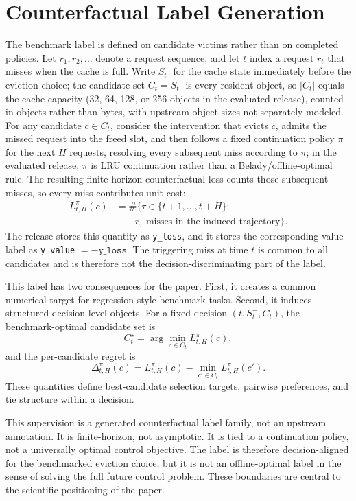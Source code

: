 \section{Counterfactual Label Generation}
\label{sec:label-generation}

The benchmark label is defined on candidate victims rather than on completed policies. Let $r_1, r_2, \ldots$ denote a request sequence, and let $t$ index a request $r_t$ that misses when the cache is full. Write $S_t^{-}$ for the cache state immediately before the eviction choice; the candidate set $C_t = S_t^{-}$ is every resident object, so $|C_t|$ equals the cache capacity (32, 64, 128, or 256 objects in the evaluated release), counted in objects rather than bytes, with upstream object sizes not separately modeled. For any candidate $c \in C_t$, consider the intervention that evicts $c$, admits the missed request into the freed slot, and then follows a fixed continuation policy $\pi$ for the next $H$ requests, resolving every subsequent miss according to $\pi$; in the evaluated release, $\pi$ is LRU continuation rather than a Belady/offline-optimal rule. The resulting finite-horizon counterfactual loss counts those subsequent misses, so every miss contributes unit cost:
\[
\begin{aligned}
L_{t,H}^{\pi}(c)
&=
\#\{\tau \in \{t+1, \ldots, t+H\} : \\
&\qquad r_{\tau} \text{ misses in the induced trajectory}\}.
\end{aligned}
\]
The release stores this quantity as \texttt{y\_loss}, and it stores the corresponding value label as \texttt{y\_value} $= -\texttt{y\_loss}$. The triggering miss at time $t$ is common to all candidates and is therefore not the decision-discriminating part of the label.

This label has two consequences for the paper. First, it creates a common numerical target for regression-style benchmark tasks. Second, it induces structured decision-level objects. For a fixed decision $(t, S_t^{-}, C_t)$, the benchmark-optimal candidate set is
\[
C_t^{\star} = \arg\min_{c \in C_t} L_{t,H}^{\pi}(c),
\]
and the per-candidate regret is
\[
\Delta_{t,H}^{\pi}(c) = L_{t,H}^{\pi}(c) - \min_{c' \in C_t} L_{t,H}^{\pi}(c').
\]
These quantities define best-candidate selection targets, pairwise preferences, and tie structure within a decision.

This supervision is a generated counterfactual label family, not an upstream annotation. It is finite-horizon, not asymptotic. It is tied to a continuation policy, not a universally optimal control objective. The label is therefore decision-aligned for the benchmarked eviction choice, but it is not an offline-optimal label in the sense of solving the full future control problem. These boundaries are central to the scientific positioning of the paper.
